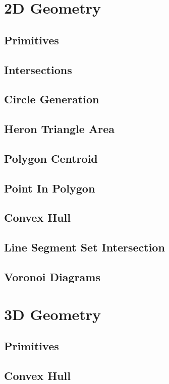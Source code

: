 \documentclass[twocolumn]{article}
\begin{document}
	\section{2D Geometry}
		\subsection{Primitives}
			
		\subsection{Intersections}
			
		\subsection{Circle Generation}
			
		\subsection{Heron Triangle Area}
		\subsection{Polygon Centroid}
			
		\subsection{Point In Polygon}
		\subsection{Convex Hull}
		\subsection{Line Segment Set Intersection}
		\subsection{Voronoi Diagrams}
	\section{3D Geometry}
		\subsection{Primitives}
		\subsection{Convex Hull}
\end{document}

